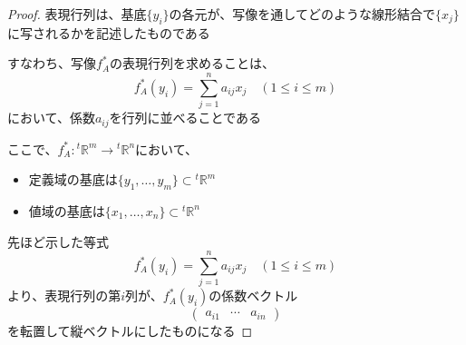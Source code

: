 \documentclass[../../../topic_linear-algebra]{subfiles}
\begin{document}
\begin{proof}

  \br

  表現行列は、基底$\{y_i\}$の各元が、写像を通してどのような線形結合で$\{x_j\}$に写されるかを記述したものである

  \br

  すなわち、写像$f_A^*$の表現行列を求めることは、
  \begin{equation*}
    f_A^*(y_i) = \sum_{j=1}^n a_{ij} x_j \quad (1 \leq i \leq m)
  \end{equation*}
  において、係数$a_{ij}$を行列に並べることである

  \br

  ここで、$f_A^* \colon {}^t\mathbb{R}^m \to {}^t\mathbb{R}^n$において、
  \begin{itemize}
    \item 定義域の基底は$\{ y_1, \ldots, y_m \} \subset {}^t\mathbb{R}^m$
    \item 値域の基底は$\{ x_1, \ldots, x_n \} \subset {}^t\mathbb{R}^n$
  \end{itemize}

  \br

  先ほど示した等式
  \begin{equation*}
    f_A^*(y_i) = \sum_{j=1}^n a_{ij} x_j \quad (1 \leq i \leq m)
  \end{equation*}
  より、表現行列の第$i$列が、$f_A^*(y_i)$の係数ベクトル
  \begin{equation*}
    \begin{pmatrix}
      a_{i1} & \cdots & a_{in}
    \end{pmatrix}
  \end{equation*}
  を転置して縦ベクトルにしたものになる
\end{proof}
\end{document}
